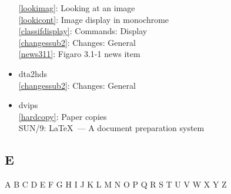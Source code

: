 \documentclass[11pt,twoside]{article}
\newcommand{\htmlref}[2]{#1}
\newcommand{\xref}[3]{#1}
\newcommand{\idxint}[2]{\ref{#1}: \htmlref{#2}{#1}}
\newcommand{\idxint}[2]{\htmlref{#2}{#1}}
\newcommand{\latorhtm}[2]{#1}
\newcommand{\latorhtm}[2]{#2}
\begin{document}
\begin{itemize}
   \idxint{lookimag}{Looking at an image}\\
   \idxint{lookicont}{Image display in monochrome}\\
   \idxint{classifdisplay}{Commands: Display}\\
   \idxint{changessub2}{Changes: General}\\
   \idxint{news311}{Figaro 3.1-1 news item}
\item dta2hds\\
   \idxint{changessub2}{Changes: General}
\item dvips\\
   \idxint{hardcopy}{Paper copies}\\
   \xref{SUN/9: \LaTeX\ \latorhtm{---}{-} A document preparation system}{sun9}{}
\end{itemize}

\subsection*{\label{index_E}E}

\begin{htmlonly}
\htmlref{A}{index_A}
\htmlref{B}{index_B}
\htmlref{C}{index_C}
\htmlref{D}{index_D}
E
\htmlref{F}{index_F}
\htmlref{G}{index_G}
\htmlref{H}{index_H}
\htmlref{I}{index_I}
\htmlref{J}{index_J}
\htmlref{K}{index_K}
\htmlref{L}{index_L}
\htmlref{M}{index_M}
\htmlref{N}{index_N}
\htmlref{O}{index_O}
\htmlref{P}{index_P}
\htmlref{Q}{index_Q}
\htmlref{R}{index_R}
\htmlref{S}{index_S}
\htmlref{T}{index_T}
\htmlref{U}{index_U}
\htmlref{V}{index_V}
\htmlref{W}{index_W}
\htmlref{X}{index_X}
\htmlref{Y}{index_Y}
Z
\end{htmlonly}
\end{document}
